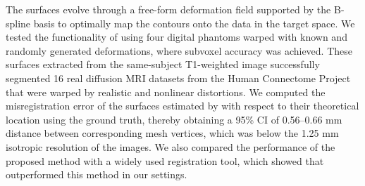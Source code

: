 The surfaces evolve through a free-form deformation field supported by the B-spline basis
  to optimally map the contours onto the data in the target space.
We tested the functionality of \regseg{} using four digital phantoms warped with known and
  randomly generated deformations, where subvoxel accuracy was achieved.
These surfaces extracted from the same-subject T1-weighted image successfully segmented 16 real
  diffusion MRI datasets from the Human Connectome Project that were warped by realistic and nonlinear
  distortions.
We computed the misregistration error of the surfaces estimated by \regseg{} with respect
  to their theoretical location using the ground truth, thereby obtaining a 95\% CI of 0.56--0.66 mm
  distance between corresponding mesh vertices, which was below the 1.25 mm isotropic resolution of the images.
We also compared the performance of the proposed method with a widely used registration tool, which showed
  that \regseg{} outperformed this method in our settings.